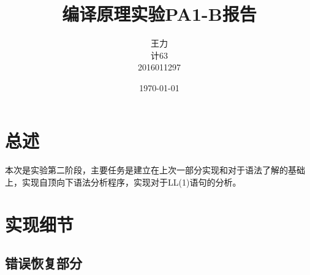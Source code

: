 \documentclass[UTF8]{ctexart}
\begin{document}
\title{编译原理实验PA1-B报告}
\author{王力\\计63\\2016011297}
\date{\today}
\maketitle
\section{总述}
\paragraph{}本次是实验第二阶段，主要任务是建立在上次一部分实现和对于语法了解的基础上，实现自顶向下语法分析程序，实现对于LL(1)语句的分析。
\section{实现细节}
\subsection{错误恢复部分}
\end{document}
